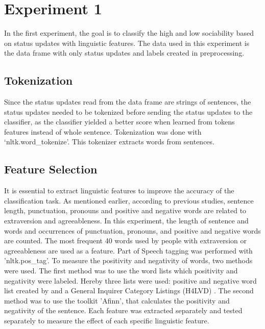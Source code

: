 \documentclass[
10pt, %
a4paper, %
oneside, %
headinclude,footinclude, %
] {book}%
\begin{document}
\section{Experiment 1}
In the first experiment, the goal is to classify the high and low sociability based on status updates with linguistic features. The data used in this experiment is the data frame with only status updates and labels created in preprocessing.

\subsection{Tokenization}
Since the status updates read from the data frame are strings of sentences, the status updates needed to be tokenized before sending the status updates to the classifier, as the classifier yielded a better score when learned from tokens features instead of whole sentence. Tokenization was done with ‘nltk.word\_tokenize’. This tokenizer extracts words from sentences. 

\subsection {Feature Selection}
It is essential to extract linguistic features to improve the accuracy of the classification task. As mentioned earlier, according to previous studies, sentence length, punctuation, pronouns and positive and negative words are related to extraversion and agreeableness. In this experiment, the length of sentence and words and occurrences of punctuation, pronouns, and positive and negative words are counted. The most frequent 40 words used by people with extraversion or agreeableness are used as a feature. Part of Speech tagging was performed with 'nltk.pos\_tag'. To measure the positivity and negativity of words, two methods were used. The first method was to use the word lists which positivity and negativity were labeled. Hereby three lists were used: positive and negative word list created by \citet{liu2010sentiment} and a General Inquirer Category Listings (H4LVD) . The second method was to use the toolkit 'Afinn', that calculates the positivity and negativity of the sentence. Each feature was extracted separately and tested separately to measure the effect of each specific linguistic feature.  
\end{document}
